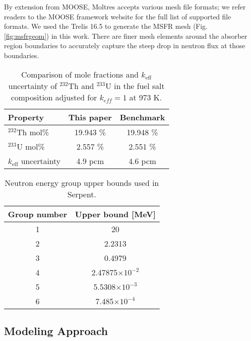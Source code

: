 By extension from MOOSE, Moltres accepts various mesh file formats; we refer
readers to the MOOSE framework website for the full list of supported file
formats. We used the Trelis 16.5 \cite{noauthor_trelis_2018} to generate the
\gls{MSFR} mesh (Fig. \ref{fig:msfrgeom}) in this work. There are finer mesh
elements around the absorber region boundaries to accurately capture the steep
drop in neutron flux at those boundaries.
%
\begin{table}[htb!]
	\centering
    \caption{Comparison of mole fractions and $k_{\text{eff}}$ uncertainty
    of $^{232}$Th and $^{233}$U in
    the fuel salt composition adjusted for $k_{eff}=1$ at 973 K.}
\begin{tabular}{l S S}
	\hline
	\textbf{Property} & \textbf{This paper} & \textbf{Benchmark
	\cite{brovchenko_neutronic_2019}} \\
	\hline
    $^{232}$Th mol\% & 19.943 \% & 19.948 \% \\
    $^{233}$U mol\% & 2.557 \% & 2.551 \% \\
    $k_{\text{eff}}$ uncertainty & 4.9 pcm & 4.6 pcm \\
    \hline
\end{tabular}
\label{table:mole}
\end{table}
%
\begin{table}[htb!]
	\centering
	\caption{Neutron energy group upper bounds used in Serpent.}
	\begin{tabular}{c S}
		\hline
		{Group number} & {Upper bound [MeV]}\\
		 & 20\\
		2 & 2.2313\\
		3 & 0.4979\\
		4 & 2.47875$\times 10^{-2}$\\
		5 & 5.5308$\times 10^{-3}$\\
		6 & 7.485$\times 10^{-4}$\\
		\hline
	\end{tabular}
	\label{table:bound}
\end{table}
%
\subsection{Modeling Approach}

